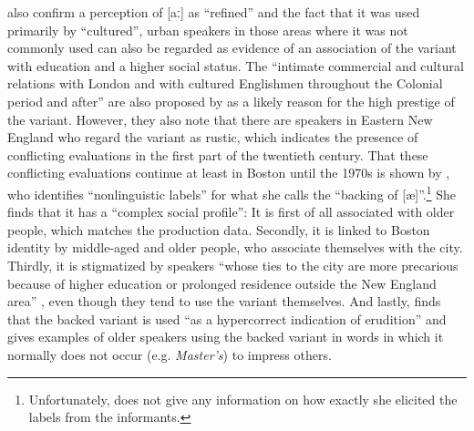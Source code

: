 \citet[136]{Kurath1961} also confirm a perception of [aː] as “refined” and the fact that it was used primarily by “cultured”, urban speakers in those areas where it was not commonly used can also be regarded as evidence of an association of the variant with education and a higher social status. The “intimate commercial and cultural relations with London and with cultured Englishmen throughout the Colonial period and after” are also proposed by \citet[136]{Kurath1961} as a likely reason for the high prestige of the variant. However, they also note that there are speakers in Eastern New England who regard the variant as rustic, which indicates the presence of conflicting evaluations in the first part of the twentieth century. That these conflicting evaluations continue at least in Boston until the 1970s is shown by \citet[105--106]{Laferriere1977}, who identifies “nonlinguistic labels” for what she calls the “backing of [æ]”.\footnote{Unfortunately, \citet{Laferriere1977} does not give any information on how exactly she elicited the labels from the informants.} She finds that it has a “complex social profile”: It is first of all associated with older people, which matches the production data. Secondly, it is linked to Boston identity by middle-aged and older people, who associate themselves with the city. Thirdly, it is stigmatized by speakers “whose ties to the city are more precarious because of higher education or prolonged residence outside the New England area” \citep[105]{Laferriere1977}, even though they tend to use the variant themselves. And lastly, \citet[106]{Laferriere1977} finds that the backed variant is used “as a hypercorrect indication of erudition” and gives examples of older speakers using the backed variant in words in which it normally does not occur (e.g. \emph{Master’s}) to impress others.

